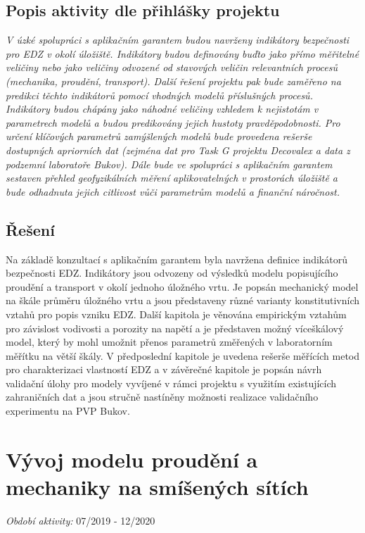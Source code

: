 \documentclass[11pt,a4paper]{article}
\begin{document}
\begin{onehalfspacing}
\subsection{Popis aktivity dle přihlášky projektu}
{\it V úzké spolupráci s aplikačním garantem budou navrženy indikátory bezpečnosti pro EDZ v okolí úložiště. Indikátory budou
definovány buďto jako přímo měřitelné veličiny nebo jako veličiny odvozené od stavových veličin relevantních procesů (mechanika,
proudění, transport). Další řešení projektu pak bude zaměřeno na predikci těchto indikátorů pomocí vhodných modelů příslušných
procesů. Indikátory budou chápány jako náhodné veličiny
vzhledem k nejistotám v parametrech modelů a budou predikovány jejich hustoty pravděpodobnosti. Pro určení klíčových parametrů
zamýšlených modelů bude provedena rešerše dostupných apriorních dat (zejména dat pro Task G projektu Decovalex a data z
podzemní laboratoře Bukov). Dále bude ve spolupráci s aplikačním garantem sestaven přehled geofyzikálních měření aplikovatelných
v prostorách úložiště a bude odhadnuta jejich citlivost vůči parametrům modelů a finanční náročnost.}


\subsection{Řešení}
Na základě konzultací s aplikačním garantem byla navržena definice indikátorů bezpečnosti EDZ. Indikátory jsou 
odvozeny od výsledků modelu popisujícího proudění a transport v okolí jednoho úložného vrtu. Je popsán mechanický model 
 na škále průměru úložného vrtu a jsou představeny různé varianty konstitutivních vztahů pro popis vzniku EDZ. 
 Další kapitola je věnována empirickým vztahům pro závislost vodivosti a porozity na napětí a je představen možný
 víceškálový model, který by mohl umožnit přenos parametrů změřených v laboratorním měřítku na větší škály.
 V předposlední kapitole je uvedena rešerše měřících metod pro charakterizaci vlastností EDZ a v závěrečné kapitole je 
 popsán návrh validační úlohy pro modely vyvíjené v rámci projektu s využitím existujících zahraničních dat
 a jsou stručně nastíněny možnosti realizace validačního experimentu na PVP Bukov. 


\section{Vývoj modelu proudění a mechaniky na smíšených sítích}
\label{sec:smisene_site}
{\it Období aktivity:}  07/2019 - 12/2020



\end{onehalfspacing}
\end{document}
